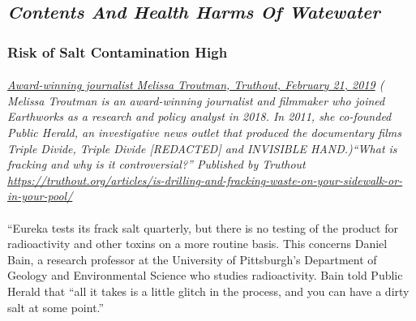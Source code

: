 \documentclass{article}
\begin{document}
\subsection{\emph{Contents And Health Harms Of Watewater}}

\subsubsection{Risk of Salt Contamination High}
\paragraph{}
\small
\textit{
\underline{Award-winning journalist Melissa Troutman, Truthout, February 21, 2019}
( Melissa Troutman is an award-winning journalist and filmmaker who joined Earthworks as a research and policy analyst in 2018. In 2011, she co-founded Public Herald, an investigative news outlet that produced the documentary films Triple Divide, Triple Divide [REDACTED] and INVISIBLE HAND.)``What is fracking and why is it controversial?'' Published by Truthout
\url{https://truthout.org/articles/is-drilling-and-fracking-waste-on-your-sidewalk-or-in-your-pool/}}
\normalsize
\paragraph{}
``Eureka tests its frack salt quarterly, but there is no testing of the product for radioactivity and other toxins on a more routine basis. This concerns Daniel Bain, a research professor at the University of Pittsburgh’s Department of Geology and Environmental Science who studies radioactivity. Bain told Public Herald that “all it takes is a little glitch in the process, and you can have a dirty salt at some point.”
\end{document}
